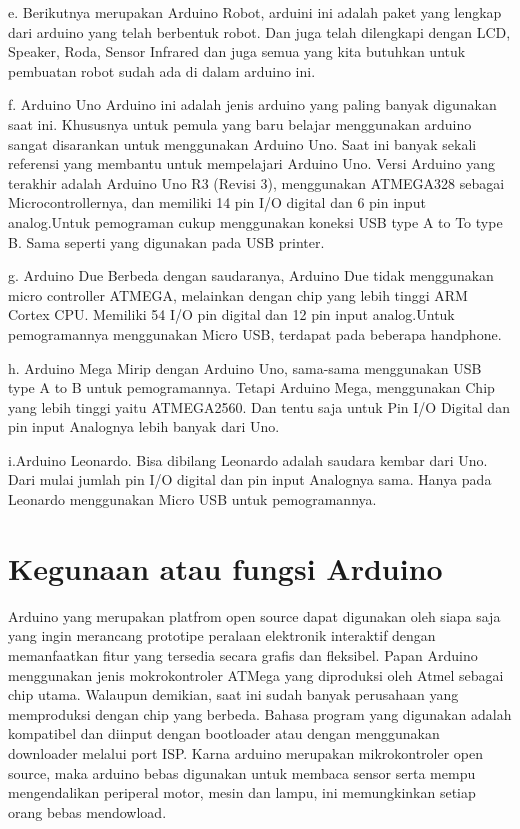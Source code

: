 e. Berikutnya merupakan Arduino Robot, arduini ini adalah paket yang lengkap dari arduino yang telah berbentuk robot. Dan juga telah dilengkapi dengan LCD, Speaker, Roda, Sensor Infrared dan juga semua yang kita butuhkan untuk pembuatan robot sudah ada di dalam arduino ini.

f. Arduino Uno
 Arduino ini adalah jenis arduino yang paling banyak digunakan saat ini. Khususnya untuk pemula yang baru belajar menggunakan arduino sangat disarankan untuk menggunakan Arduino Uno. Saat ini banyak sekali referensi yang membantu untuk mempelajari Arduino Uno. Versi Arduino yang terakhir adalah Arduino Uno R3 (Revisi 3), menggunakan ATMEGA328 sebagai Microcontrollernya, dan memiliki 14 pin I/O digital dan 6 pin input analog.Untuk pemograman cukup menggunakan koneksi USB type A to To type B. Sama seperti yang digunakan pada USB printer.

g. Arduino Due
 Berbeda dengan saudaranya, Arduino Due tidak menggunakan micro controller ATMEGA, melainkan dengan chip yang lebih tinggi ARM Cortex CPU. Memiliki 54 I/O pin digital dan 12 pin input analog.Untuk pemogramannya menggunakan Micro USB, terdapat pada beberapa handphone.

h. Arduino Mega Mirip dengan Arduino Uno, sama-sama menggunakan USB type A to B untuk pemogramannya. Tetapi Arduino Mega, menggunakan Chip yang lebih tinggi
  yaitu ATMEGA2560. Dan tentu saja untuk Pin I/O Digital dan pin input Analognya lebih banyak dari Uno.

i.Arduino Leonardo. 
 Bisa dibilang Leonardo adalah saudara kembar dari Uno. Dari mulai jumlah pin I/O digital dan pin input Analognya sama. Hanya pada Leonardo menggunakan Micro USB untuk pemogramannya.

\section{Kegunaan atau fungsi Arduino}
 	    Arduino yang merupakan platfrom open source dapat digunakan oleh siapa saja yang ingin merancang prototipe peralaan elektronik interaktif dengan memanfaatkan fitur yang tersedia secara grafis dan fleksibel. Papan Arduino menggunakan jenis mokrokontroler ATMega yang diproduksi oleh Atmel sebagai chip utama. Walaupun demikian, saat ini sudah banyak perusahaan yang memproduksi dengan chip yang berbeda. Bahasa program yang digunakan adalah kompatibel dan diinput dengan bootloader atau dengan menggunakan downloader melalui port ISP. Karna arduino merupakan mikrokontroler open source, maka arduino bebas digunakan untuk membaca sensor serta mempu mengendalikan periperal motor, mesin dan lampu, ini memungkinkan setiap orang bebas mendowload.\cite{beug2012teaching}
